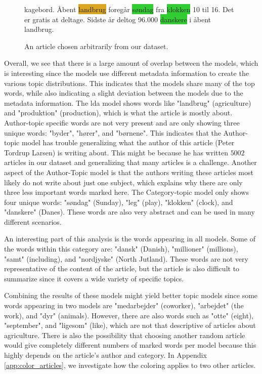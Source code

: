 \begin{figure}
\begin{tcolorbox}
{kagebord. Åbent \colorbox{Goldenrod}{landbrug} foregår \colorbox{LimeGreen}{søndag} fra \colorbox{LimeGreen}{klokken} 10 til 16. Det er gratis at deltage. Sidste år deltog 96.000 \colorbox{LimeGreen}{danskere} i åbent landbrug.
		}
	\end{tcolorbox}
	\caption{An article chosen arbitrarily from our dataset.}
	\label{fig:the_article}
\end{figure}

Overall, we see that there is a large amount of overlap between the models, which is interesting since the models use different metadata information to create the various topic distributions.
This indicates that the models share many of the top words, while also indicating a slight deviation between the models due to the metadata information.
The \gls{lda} model shows words like "landbrug" (agriculture) and "produktion" (production), which is what the article is mostly about.
Author-topic specific words are not very present and are only showing three unique words: "byder", "hører", and "børnene".
This indicates that the Author-topic model has trouble generalizing what the author of this article (Peter Tordrup Larsen) is writing about. 
This might be because he has written $5002$ articles in our dataset and generalizing that many articles is a challenge.
Another aspect of the Author-Topic model is that the authors writing these articles most likely do not write about just one subject, which explains why there are only three less important words marked here. 
The Category-topic model only shows four unique words: "søndag" (Sunday), "leg" (play), "klokken" (clock), and "danskere" (Danes).
These words are also very abstract and can be used in many different scenarios.

An interesting part of this analysis is the words appearing in all models.
Some of the words within this category are: "dansk" (Danish), "millioner" (millions), "samt" (including), and "nordjyske" (North Jutland).
These words are not very representative of the content of the article, but the article is also difficult to summarize since it covers a wide variety of specific topics.

Combining the results of these models might yield better topic models since some words appearing in two models are "medarbejder" (coworker), "arbejdet" (the work), and "dyr" (animals).
However, there are also words such as "otte" (eight), "september", and "ligesom" (like), which are not that descriptive of articles about agriculture. 
There is also the possibility that choosing another random article would give completely different numbers of marked words per model because this highly depends on the article's author and category.
In Appendix \autoref{app:color_articles}, we investigate how the coloring applies to two other articles.




